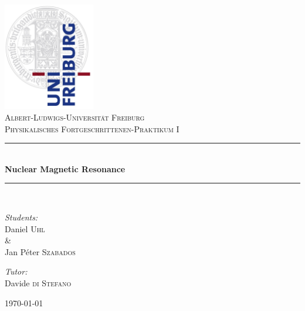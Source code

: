 
\begin{titlepage}

\begin{center}



\includegraphics[width=0.3\textwidth]{Bilder/logo}\\[1.2cm]    

\textsc{\LARGE Albert-Ludwigs-Universit\"at Freiburg}\\[1.75cm]

\textsc{\Large Physikalisches Fortgeschrittenen-Praktikum I}\\[0.75cm]



\newcommand{\HRule}{\rule{\linewidth}{0.5mm}}
\HRule \\[0.5cm]
{ \huge \bfseries Nuclear Magnetic Resonance}\\[0.5cm]

\HRule \\[1.75cm]


\begin{minipage}{0.4\textwidth}
\begin{flushleft} \large
\emph{Students:}\\
Daniel \textsc{Uhl}\\ \setlength{\parindent}{1.25cm} \& 
\setlength{\parindent}{0cm} \\ Jan P\'eter \textsc{Szabados} 
\end{flushleft}
\end{minipage}
\hfill
\begin{minipage}{0.4\textwidth}
\begin{flushright} \large
\emph{Tutor:} \\
Davide \textsc{di Stefano}\\
\end{flushright}
\end{minipage}

\vfill


{\large \today}

\end{center}

\end{titlepage}
